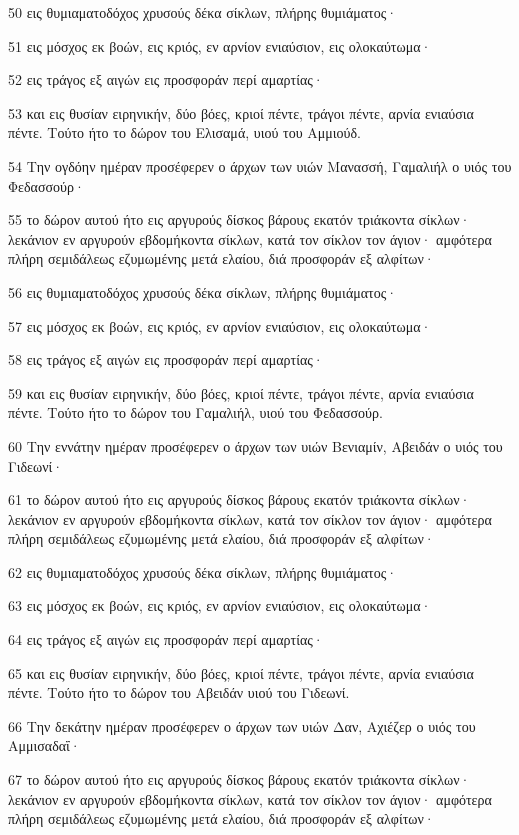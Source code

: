 \par 50 εις θυμιαματοδόχος χρυσούς δέκα σίκλων, πλήρης θυμιάματος·
\par 51 εις μόσχος εκ βοών, εις κριός, εν αρνίον ενιαύσιον, εις ολοκαύτωμα·
\par 52 εις τράγος εξ αιγών εις προσφοράν περί αμαρτίας·
\par 53 και εις θυσίαν ειρηνικήν, δύο βόες, κριοί πέντε, τράγοι πέντε, αρνία ενιαύσια πέντε. Τούτο ήτο το δώρον του Ελισαμά, υιού του Αμμιούδ.
\par 54 Την ογδόην ημέραν προσέφερεν ο άρχων των υιών Μανασσή, Γαμαλιήλ ο υιός του Φεδασσούρ·
\par 55 το δώρον αυτού ήτο εις αργυρούς δίσκος βάρους εκατόν τριάκοντα σίκλων· λεκάνιον εν αργυρούν εβδομήκοντα σίκλων, κατά τον σίκλον τον άγιον· αμφότερα πλήρη σεμιδάλεως εζυμωμένης μετά ελαίου, διά προσφοράν εξ αλφίτων·
\par 56 εις θυμιαματοδόχος χρυσούς δέκα σίκλων, πλήρης θυμιάματος·
\par 57 εις μόσχος εκ βοών, εις κριός, εν αρνίον ενιαύσιον, εις ολοκαύτωμα·
\par 58 εις τράγος εξ αιγών εις προσφοράν περί αμαρτίας·
\par 59 και εις θυσίαν ειρηνικήν, δύο βόες, κριοί πέντε, τράγοι πέντε, αρνία ενιαύσια πέντε. Τούτο ήτο το δώρον του Γαμαλιήλ, υιού του Φεδασσούρ.
\par 60 Την εννάτην ημέραν προσέφερεν ο άρχων των υιών Βενιαμίν, Αβειδάν ο υιός του Γιδεωνί·
\par 61 το δώρον αυτού ήτο εις αργυρούς δίσκος βάρους εκατόν τριάκοντα σίκλων· λεκάνιον εν αργυρούν εβδομήκοντα σίκλων, κατά τον σίκλον τον άγιον· αμφότερα πλήρη σεμιδάλεως εζυμωμένης μετά ελαίου, διά προσφοράν εξ αλφίτων·
\par 62 εις θυμιαματοδόχος χρυσούς δέκα σίκλων, πλήρης θυμιάματος·
\par 63 εις μόσχος εκ βοών, εις κριός, εν αρνίον ενιαύσιον, εις ολοκαύτωμα·
\par 64 εις τράγος εξ αιγών εις προσφοράν περί αμαρτίας·
\par 65 και εις θυσίαν ειρηνικήν, δύο βόες, κριοί πέντε, τράγοι πέντε, αρνία ενιαύσια πέντε. Τούτο ήτο το δώρον του Αβειδάν υιού του Γιδεωνί.
\par 66 Την δεκάτην ημέραν προσέφερεν ο άρχων των υιών Δαν, Αχιέζερ ο υιός του Αμμισαδαΐ·
\par 67 το δώρον αυτού ήτο εις αργυρούς δίσκος βάρους εκατόν τριάκοντα σίκλων· λεκάνιον εν αργυρούν εβδομήκοντα σίκλων, κατά τον σίκλον τον άγιον· αμφότερα πλήρη σεμιδάλεως εζυμωμένης μετά ελαίου, διά προσφοράν εξ αλφίτων·
